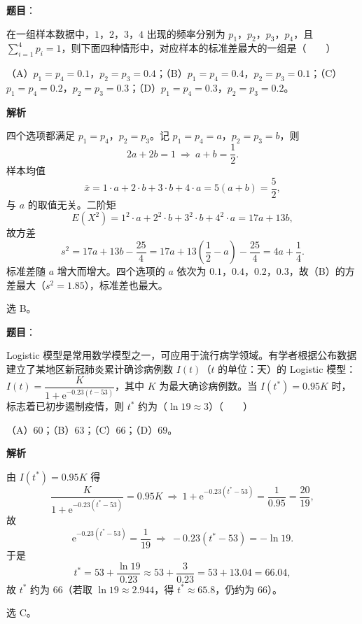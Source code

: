 \begin{answer}

\textbf{题目}：

在一组样本数据中，$1$，$2$，$3$，$4$ 出现的频率分别为 $p_1$，$p_2$，$p_3$，$p_4$，且 $\sum\limits_{i=1}^4p_i=1$，则下面四种情形中，对应样本的标准差最大的一组是\mbox{（　　）}

（A）$p_1=p_4=0.1$，$p_2=p_3=0.4$；（B）$p_1=p_4=0.4$，$p_2=p_3=0.1$；（C）$p_1=p_4=0.2$，$p_2=p_3=0.3$；（D）$p_1=p_4=0.3$，$p_2=p_3=0.2$。

\textbf{解析}

四个选项都满足 $p_1=p_4$，$p_2=p_3$。记 $p_1=p_4=a$，$p_2=p_3=b$，则
\nopagebreak[4]
\[2a+2b=1\ \Longrightarrow\ a+b=\frac12 .\]
样本均值
\nopagebreak[4]
\[\bar x=1\cdot a+2\cdot b+3\cdot b+4\cdot a=5(a+b)=\frac52,\]
与 $a$ 的取值无关。二阶矩
\nopagebreak[4]
\[E(X^2)=1^2\cdot a+2^2\cdot b+3^2\cdot b+4^2\cdot a=17a+13b,\]
故方差
\nopagebreak[4]
\[s^2=17a+13b-\frac{25}4=17a+13\left(\frac12-a\right)-\frac{25}4=4a+\frac14 .\]
标准差随 $a$ 增大而增大。四个选项的 $a$ 依次为 $0.1$，$0.4$，$0.2$，$0.3$，故（B）的方差最大（$s^2=1.85$），标准差也最大。

选 B。


\end{answer}
\begin{answer}

\textbf{题目}：

Logistic 模型是常用数学模型之一，可应用于流行病学领域。有学者根据公布数据建立了某地区新冠肺炎累计确诊病例数 $I(t)$（$t$ 的单位：天）的 Logistic 模型：$I(t)=\dfrac K{1+\mathrm e^{-0.23(t-53)}}$，其中 $K$ 为最大确诊病例数。当 $I(t^*)=0.95K$ 时，标志着已初步遏制疫情，则 $t^*$ 约为（$\ln19\approx3$）\mbox{（　　）}

（A）$60$；（B）$63$；（C）$66$；（D）$69$。

\textbf{解析}

由 $I(t^*)=0.95K$ 得
\nopagebreak[4]
\[\frac K{1+\mathrm e^{-0.23(t^*-53)}}=0.95K\ \Longrightarrow\ 1+\mathrm e^{-0.23(t^*-53)}=\frac1{0.95}=\frac{20}{19},\]
故
\nopagebreak[4]
\[\mathrm e^{-0.23(t^*-53)}=\frac1{19}\ \Longrightarrow\ -0.23(t^*-53)=-\ln19 .\]
于是
\nopagebreak[4]
\[t^*=53+\frac{\ln19}{0.23}\approx53+\frac3{0.23}=53+13.04=66.04,\]
故 $t^*$ 约为 $66$（若取 $\ln19\approx2.944$，得 $t^*\approx65.8$，仍约为 $66$）。

选 C。


\end{answer}
